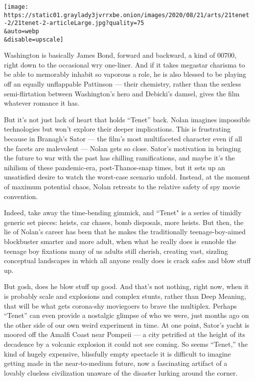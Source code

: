\texttt{[image: https://static01.graylady3jvrrxbe.onion/images/2020/08/21/arts/21tenet-2/21tenet-2-articleLarge.jpg?quality=75\\\&auto=webp\\\&disable=upscale]}

Washington is basically James Bond, forward and backward, a kind of
00700, right down to the occasional wry one-liner. And if it takes
megastar charisma to be able to memorably inhabit so vaporous a role, he
is also blessed to be playing off an equally unflappable Pattinson ---
their chemistry, rather than the sexless semi-flirtation between
Washington's hero and Debicki's damsel, gives the film whatever romance
it has.

But it's not just lack of heart that holds ``Tenet'' back. Nolan
imagines impossible technologies but won't explore their deeper
implications. This is frustrating because in Branagh's Sator --- the
film's most multifaceted character even if all the facets are malevolent
--- Nolan gets so close. Sator's motivation in bringing the future to
war with the past has chilling ramifications, and maybe it's the
nihilism of these pandemic-era, post-Thanos-snap times, but it sets up
an unsatisfied desire to watch the worst-case scenario unfold. Instead,
at the moment of maximum potential chaos, Nolan retreats to the relative
safety of spy movie convention.

Indeed, take away the time-bending gimmick, and ``Tenet" is a series of
timidly generic set pieces: heists, car chases, bomb disposals, more
heists. But then, the lie of Nolan's career has been that he makes the
traditionally teenage-boy-aimed blockbuster smarter and more adult, when
what he really does is ennoble the teenage boy fixations many of us
adults still cherish, creating vast, sizzling conceptual landscapes in
which all anyone really does is crack safes and blow stuff up.

But gosh, does he blow stuff up good. And that's not nothing, right now,
when it is probably scale and explosions and complex stunts, rather than
Deep Meaning, that will be what gets corona-shy moviegoers to brave the
multiplex. Perhaps ``Tenet'' can even provide a nostalgic glimpse of who
we were, just months ago on the other side of our own weird experiment
in time. At one point, Sator's yacht is moored off the Amalfi Coast near
Pompeii --- a city petrified at the height of its decadence by a
volcanic explosion it could not see coming. So seems ``Tenet,'' the kind
of hugely expensive, blissfully empty spectacle it is difficult to
imagine getting made in the near-to-medium future, now a fascinating
artifact of a lovably clueless civilization unaware of the disaster
lurking around the corner.

